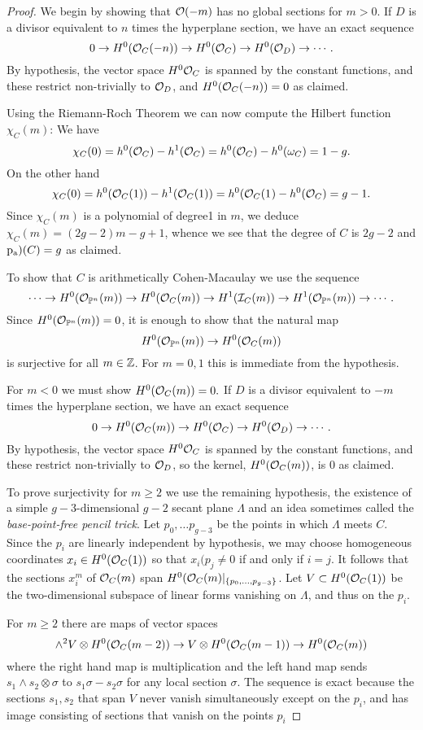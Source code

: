 \begin{proof}
We begin by showing that $\sO(-m)$ has no global sections for $m>0$.
If $D$ is a divisor equivalent to $n$ times the hyperplane section, we have an exact sequence
$$
0\to \HH^{0}(\sO_{C}(-n)) \to \HH^{0}(\sO_{C}) \to \HH^{0}(\sO_{D}) \to \cdots.
$$
By hypothesis, the vector space $\HH^{0}\sO_{C}$ is spanned by the constant functions, and these
restrict non-trivially to $\sO_{D}$, and $\HH^{0}(\sO_{C}(-n)) = 0$ as claimed.

Using the Riemann-Roch Theorem we can now compute the Hilbert function $\chi_{C}(m)$:
We have 
$$
\chi_{C}(0) = h^{0}(\sO_{C}) - h^{1}(\sO_{C}) = h^{0}(\sO_{C}) - h^{0}(\omega_{C}) = 1-g.
$$
On the other hand 
$$
\chi_{C}(0) = h^{0}(\sO_{C}(1)) - h^{1}(\sO_{C}(1)) = h^{0}(\sO_{C}(1_{}) - h^{0}(\sO_{C}) = g-1.
$$
Since $\chi_{C}(m)$ is a polynomial of degree1 in $m$, we deduce
$\chi_{C}(m) = (2g-2)m -g+1$, whence we see that the degree of $C$ is $2g-2$ and $\p(C) = g$ as claimed.

To show that
$C$ is arithmetically Cohen-Macaulay we use the sequence
$$
\cdots \to \HH^{0}(\sO_{\PP^{n}}(m)) \to \HH^{0}(\sO_{C}(m))
\to \HH^{1}(\sI_{C}(m))\to \HH^{1}(\sO_{\PP^{n}}(m)) \to\cdots .
$$
Since $\HH^{0}(\sO_{\PP^{n}}(m)) = 0$, it
is enough to show that the natural map 
$$
\HH^{0}(\sO_{\PP^{n}}(m)) \to \HH^{0}(\sO_{C}(m))
$$
 is surjective for all $m\in \ZZ$. For $m=0,1$ this is immediate from the hypothesis.

For $m <0$ we must show $\HH^{0}(\sO_{C}(m))=0.$ 
If $D$ is a divisor equivalent to $-m$ times the hyperplane section, we have an exact sequence
$$
0\to \HH^{0}(\sO_{C}(m)) 
\to \HH^{0}(\sO_{C}) 
\to \HH^{0}(\sO_{D}) \to \cdots.
$$
By hypothesis, the vector space $\HH^{0}\sO_{C}$ is spanned by the constant functions, and these
restrict non-trivially to $\sO_{D}$, so the kernel, $\HH^{0}(\sO_{C}(m))$, is 0 as claimed. 

To prove surjectivity for $m\geq 2$ we use the remaining hypothesis, the existence of
a simple $g-3$-dimensional $g-2$ secant plane $\Lambda$  and an idea sometimes called the \emph{base-point-free pencil trick}. Let $p_{0},\dots p_{g-3}$ be the points in which $\Lambda$ meets $C$.  Since the
$p_{i}$ are linearly independent by hypothesis, we may choose homogeneous coordinates $x_{i} \in \HH^{0}(\sO_{C}(1))$ so that
$x_{i}(p_{j} \neq 0$ if and only if $i = j$. It follows that the sections
$x_{i}^{m}$ of $\sO_{C}(m)$ span $\HH^{0}(\sO_{C}(m)|_{\{p_{0}, \dots, p_{g-3}\}}$. Let 
$V\subset \HH^{0}(\sO_{C}(1))$ be the two-dimensional subspace of linear forms vanishing on
$\Lambda$, and thus on the $p_{i}$. 

For $m\geq 2$ there are maps of vector spaces
$$
\wedge^{2} V\otimes \HH^{0}(\sO_{C}(m-2)) \to V\otimes \HH^{0}(\sO_{C}(m-1)) 
\to \HH^{0}(\sO_{C}(m))
$$
where the right hand map is multiplication and the left hand map sends
$s_{1}\wedge s_{2}\otimes \sigma$ to $s_{1}\sigma-s_{2}\sigma$ for any local section $\sigma$.
The sequence is exact because the sections $s_{1},s_{2}$ that span $V$ never vanish simultaneously except on the $p_{i}$, and has image  consisting of sections that vanish on the points $p_{i}$

\end{proof}

